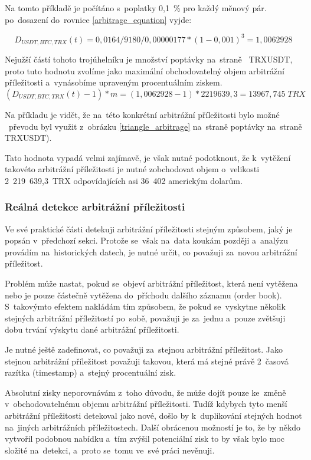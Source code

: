 \documentclass[thesis=B,czech]{FITthesis}[2019/03/21]
\begin{document}
Na tomto příkladě je počítáno s~poplatky 0,1~\% pro každý měnový pár. po~dosazení do~rovnice \ref{arbitrage_equation} vyjde:

\[D_{USDT,BTC,TRX}(t) = 0,0164 / 9180 / 0,00000177 * (1 - 0,001)^3 = 1,0062928 \]

Nejužší částí tohoto trojúhelníku je množství poptávky na~straně \linebreak~TRXUSDT, proto tuto hodnotu zvolíme jako maximální obchodovatelný objem arbitrážní příležitosti a~vynásobíme upraveným procentuálním ziskem. 
\[(D_{USDT,BTC,TRX}(t) - 1) * m = (1,0062928 - 1) * 2219639,3 = 13967,745\;TRX\]

Na příkladu je vidět, že na~této konkrétní arbitrážní příležitosti bylo možné ~převodu byl využit z~obrázku \ref{triangle_arbitrage} na~straně poptávky na~straně TRXUSDT).

Tato hodnota vypadá velmi zajímavě, je však nutné podotknout, že \linebreak k~vytěžení takovéto arbitrážní příležitosti je nutné zobchodovat objem o~velikosti 2~219~639,3~TRX odpovídajících asi 36~402 americkým dolarům. 

\subsubsection{Reálná detekce arbitrážní příležitosti}
Ve své praktické části detekuji arbitrážní příležitosti stejným způsobem, jaký je popsán v~předchozí sekci. Protože se~však na~data koukám později a~analýzu provádím na~historických datech, je nutné určit, co považuji za~novou arbitrážní příležitost.

Problém může nastat, pokud se~objeví arbitrážní příležitost, která není vytěžena nebo je pouze částečně vytěžena do~příchodu dalšího záznamu (order book). S~takovýmto efektem nakládám tím způsobem, že pokud se~vyskytne několik stejných arbitrážní příležitostí po~sobě, považuji je za~jednu a~pouze zvětšuji dobu trvání výskytu dané arbitrážní příležitosti.

Je nutné ještě zadefinovat, co považuji za~stejnou arbitrážní příležitost. Jako stejnou arbitrážní příležitost považuji takovou, která má stejné právě 2~časová razítka (timestamp) a~stejný procentuální zisk. 

Absolutní zisky neporovnávám z~toho důvodu, že může dojít pouze ke~změně v~obchodovatelnému objemu arbitrážní příležitosti. Tudíž kdybych tyto menší arbitrážní příležitosti detekoval jako nové, došlo by k~duplikování stejných hodnot na~jiných arbitrážních příležitostech. Další obrácenou možností je to, že by někdo vytvořil podobnou nabídku a~tím zvýšil potenciální zisk to by však bylo moc složité na~detekci, a~proto se~tomu ve~své práci nevěnuji. 
\end{document}
